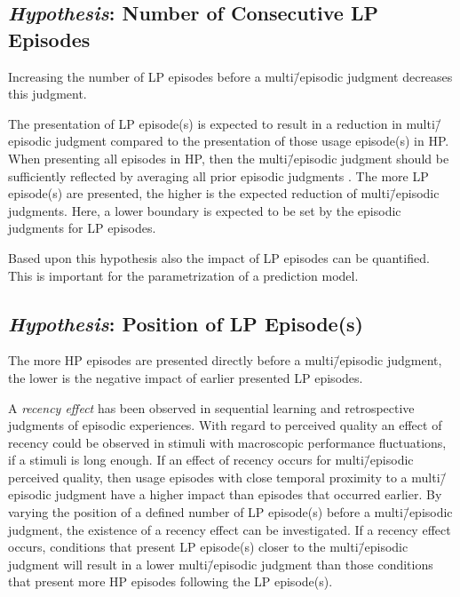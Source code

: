 \subsection[H1: Number of Consecutive \acs{LP} Episodes]{\emph{Hypothesis}: Number of Consecutive \acs{LP} Episodes}
\begin{hypothesis}\label{hypo:number}
Increasing the number of \ac{LP} episodes before a multi\=/episodic judgment decreases this judgment.
\end{hypothesis}

The presentation of \ac{LP} episode(s) is expected to result in a reduction in multi\=/episodic judgment compared to the presentation of those usage episode(s) in \ac{HP}.
When presenting all episodes in \ac{HP}, then the multi\=/episodic judgment should be sufficiently reflected by averaging all prior episodic judgments \citep[\cf,][]{moller_single-call_2011}.
The more \ac{LP} episode(s) are presented, the higher is the expected reduction of multi\=/episodic judgments.
Here, a lower boundary is expected to be set by the episodic judgments for \ac{LP} episodes.

Based upon this hypothesis also the impact of \ac{LP} episodes can be quantified.
This is important for the parametrization of a prediction model.


\subsection[H2: Position of \acs{LP} Episode(s)]{\emph{Hypothesis}: Position of \acs{LP} Episode(s)}
\begin{hypothesis}\label{hypo:position}
The more \ac{HP} episodes are presented directly before a multi\=/episodic judgment, the lower is the negative impact of earlier presented \ac{LP} episodes.
\end{hypothesis}

A \emph{recency effect} has been observed in sequential learning and retrospective judgments of episodic experiences.
With regard to perceived quality an effect of recency could be observed in stimuli with macroscopic performance fluctuations, if a stimuli is long enough.
If an effect of recency occurs for multi\=/episodic perceived quality, then usage episodes with close temporal proximity to a multi\=/episodic judgment have a higher impact than episodes that occurred earlier.
By varying the position of a defined number of \ac{LP} episode(s) before a multi\=/episodic judgment, the existence of a recency effect can be investigated.
If a recency effect occurs, conditions that present \ac{LP} episode(s) closer to the multi\=/episodic judgment will result in a lower multi\=/episodic judgment than those conditions that present more \ac{HP} episodes following the \ac{LP} episode(s).

